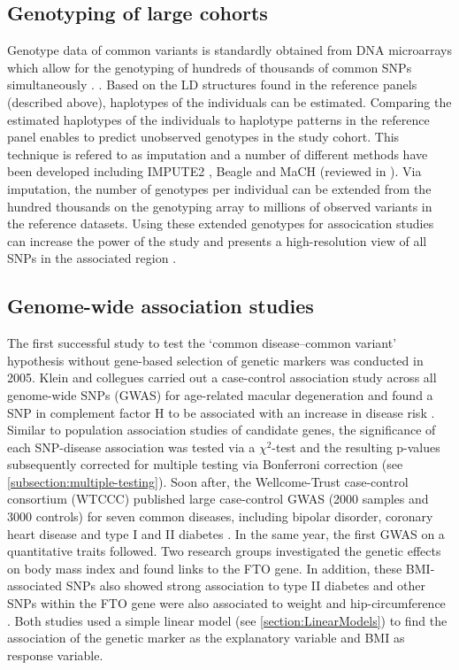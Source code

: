 \subsection{Genotyping of large cohorts}
Genotype data of common variants is standardly obtained from DNA microarrays which allow for the genotyping of hundreds of thousands of common SNPs simultaneously \citep{Wang1998}. . Based on the LD structures found in the reference panels (described above), haplotypes of the individuals can be estimated. Comparing the estimated haplotypes of the individuals to haplotype patterns in the reference panel enables to predict unobserved genotypes in the study cohort. This technique is refered to as imputation and a number of different methods have been developed including IMPUTE2 \citep{Howie2009}, Beagle \citep{Browning2007} and MaCH \citep{Li2010} (reviewed in \citep{Marchini2010}). Via imputation, the number of genotypes per individual can be extended from the hundred thousands on the genotyping array to millions of observed variants in the reference datasets. Using these extended genotypes for assocication studies can increase the power of the study and presents a high-resolution view of all SNPs in the associated region \citep{Marchini2010}.

\subsection{Genome-wide association studies}
\label{subsection:GWAS}
The first successful study to test the `common disease–common variant' hypothesis without gene-based selection of genetic markers was conducted in 2005. Klein and collegues carried out a case-control association study across all genome-wide SNPs (GWAS) for age-related macular degeneration and found a SNP in complement factor H to be associated with an increase in disease risk \citep{Klein2005}. Similar to population association studies of candidate genes, the significance of each SNP-disease association was tested via a \(\chi ^2\)-test and the resulting p-values subsequently corrected for multiple testing via Bonferroni correction (see \cref{subsection:multiple-testing}). Soon after, the Wellcome-Trust case-control consortium (WTCCC) published large case-control GWAS (\num{2000} samples and \num{3000} controls) for seven common diseases, including bipolar disorder, coronary heart disease and type I and II diabetes \citep{Burton2007}. In the same year, the first GWAS on a quantitative traits followed. Two research groups investigated the genetic effects on body mass index and found links to the FTO gene. In addition, these BMI-associated SNPs also showed strong association to type II diabetes \citep{Frayling2007} and other SNPs within the FTO gene were also associated to weight and hip-circumference \citep{Scuteri2007}. Both studies used a simple linear model  (see \cref{section:LinearModels}) to find the association of the genetic marker as the explanatory variable and BMI as response variable. 

